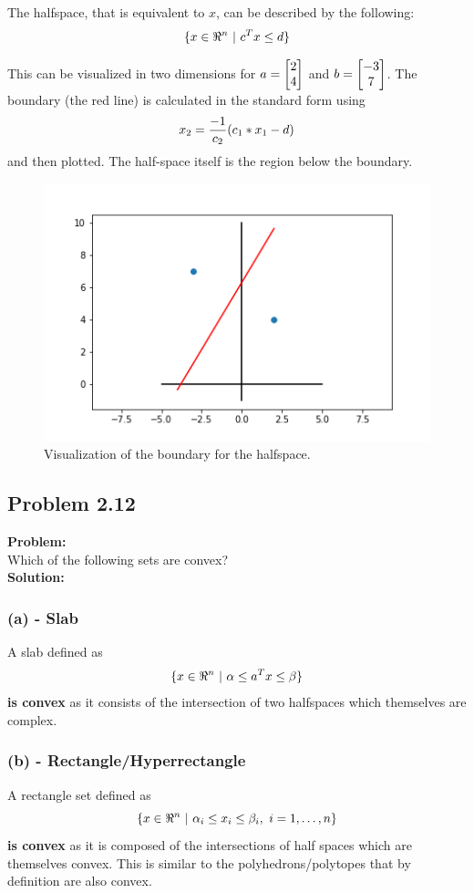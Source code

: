 \documentclass[letter]{article}
\begin{document}
The halfspace, that is equivalent to $x$, can be described by the following:
\begin{equation}
	\{x\in \real^n \ | \ c^T x \leq d\}
\end{equation}

This can be visualized in two dimensions for $a = \mqty[2\\4]$ and $b = \mqty[-3\\7]$. The boundary (the red line) is calculated in the standard form using $$x_2 = \frac{-1}{c_2} \qty(c_1 * x_1 - d)$$ and then plotted. The half-space itself is the region below the boundary.

\begin{figure}[h]
	\centering
	\includegraphics[width = 0.7\linewidth]{fig/pblm2_7}
	\caption{Visualization of the boundary for the halfspace.}
	\label{fig:pblm2_7}
\end{figure}


\subsection{Problem 2.12}
\textbf{Problem:}\\
Which of the following sets are convex?\\

\noindent
\textbf{Solution:}
\subsubsection{(a) - Slab}
A slab defined as $$\{x \in \real^n \ | \ \alpha \leq a^T x \leq \beta\}$$ \textbf{is convex} as it consists of the intersection of two halfspaces which themselves are complex.

\subsubsection{(b) - Rectangle/Hyperrectangle}
A rectangle set defined as $$\{x \in \real^n \ | \ \alpha_i \leq x_i \leq \beta_i, \ i = 1,\dots,n\}$$ \textbf{is convex} as it is composed of the intersections of half spaces which are themselves convex. This is similar to the polyhedrons/polytopes that by definition are also convex.
\end{document}
